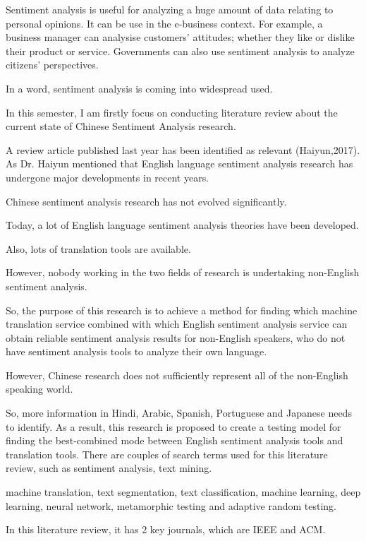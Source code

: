 \documentclass[conference]{IEEEtran}
\begin{document}
\cite{Senn:2009}


Sentiment analysis is useful for analyzing a huge amount of data relating to personal
opinions.
It can be use in the e-business context. For example, a business manager can analysise
customers’ attitudes; whether they like or dislike their product or service.
Governments can also use sentiment analysis to analyze citizens' perspectives.

In a word, sentiment analysis is coming into widespread used.

In this semester, I am firstly focus on conducting literature review about the
current state of Chinese Sentiment Analysis research.

A review article published last year has been identified as relevant
(Haiyun,2017).
As Dr. Haiyun mentioned that English language sentiment analysis research has
undergone major developments in recent years.

Chinese sentiment analysis research has not evolved significantly.

Today, a lot of English language sentiment analysis theories have been
developed.

Also, lots of translation tools are available.

However, nobody working in the two fields of research is undertaking non-English
sentiment analysis.

So, the purpose of this research is to achieve a method for finding which
machine translation service combined with which English sentiment analysis
service can obtain reliable sentiment analysis results for non-English speakers,
who do not have sentiment analysis tools to analyze their own language.

However, Chinese research does not sufficiently represent all of the non-English
speaking world.

So, more information in Hindi, Arabic, Spanish, Portuguese and Japanese needs to
identify.
As a result, this research is proposed to create a testing model for finding the
best-combined mode between English sentiment analysis tools and translation
tools.
There are couples of search terms used for this literature review, such as
sentiment analysis, text mining.

machine translation, text segmentation, text classification, machine learning,
deep learning, neural network, metamorphic testing and adaptive random testing.

In this literature review, it has 2 key journals, which are IEEE and ACM.
\end{document}
